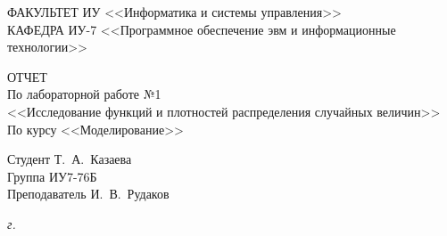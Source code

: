 \begin{titlepage}
	{
		\small \raggedright
		ФАКУЛЬТЕТ ИУ <<Информатика и системы управления>> \\
		\vspace{3.3mm}
		КАФЕДРА ИУ-7 <<Программное обеспечение эвм и информационные технологии>> \\
	}

	\vspace{15.8mm}

	{
		\LARGE
		ОТЧЕТ \\
	}
	\vspace{5mm}
	{
		\large
		По лабораторной работе №1 \\
		\vspace{2mm}
		<<Исследование функций и плотностей распределения случайных величин>> \\
		\vspace{2mm}
		По курсу <<Моделирование>>
	}

	\vfill

	Студент \hspace*{2.5cm} \hfill  Т.~А.~Казаева\\
	Группа \hspace*{2.5cm} \hfill  	ИУ7-76Б\\
	Преподаватель \hspace*{2.5cm} \hfill  И.~В.~Рудаков\\
	
	
	\vspace{20mm}
	
	\textit{{\the\year} г.}
	
\end{titlepage}